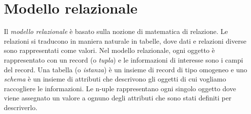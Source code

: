 \chapter{Modello relazionale}
Il \textit{modello relazionale} è basato sulla nozione di matematica di relazione. Le relazioni si traducono in maniera naturale in tabelle, dove dati e relazioni diverse sono rappresentati come valori.
Nel modello relazionale, ogni oggetto è rappresentato con un record (o \textit{tupla}) e le informazioni di interesse sono i campi del record. Una tabella (o \textit{istanza}) è un insieme di record di tipo omogeneo e uno \textit{schema} è un insieme di attributi che descrivono gli oggetti di cui vogliamo raccogliere le informazioni. Le n-uple rappresentano ogni singolo oggetto dove viene assegnato un valore a ognuno degli attributi che sono stati definiti per descriverlo.

